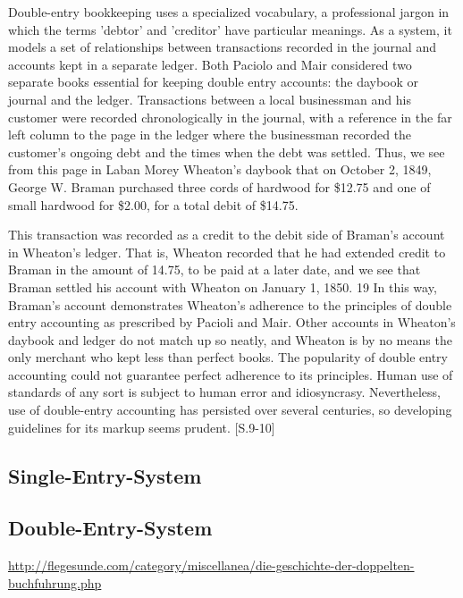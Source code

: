 \documentclass[12pt,a4paper]{article}
\begin{document}
Double-entry bookkeeping uses a specialized vocabulary, a professional jargon in which
the terms 'debtor' and 'creditor' have particular meanings. As a system, it models a set of
relationships between transactions recorded in the journal and accounts kept in a
separate ledger. Both Paciolo and Mair considered two separate books essential for
keeping double entry accounts: the daybook or journal and the ledger. Transactions
between a local businessman and his customer were recorded chronologically in the
journal, with a reference in the far left column to the page in the ledger where the
businessman recorded the customer's ongoing debt and the times when the debt was
settled. Thus, we see from this page in Laban Morey Wheaton's daybook that on October
2, 1849, George W. Braman purchased three cords of hardwood for \$12.75 and one of small
hardwood for \$2.00, for a total debit of \$14.75. 

This transaction was recorded as a credit to the debit side of Braman's account in
Wheaton's ledger. That is, Wheaton recorded that he had extended credit to Braman in
the amount of 14.75, to be paid at a later date, and we see that Braman settled his
account with Wheaton on January 1, 1850.
19 In this way, Braman's account demonstrates Wheaton's adherence to the principles of
double entry accounting as prescribed by Pacioli and Mair. Other accounts in Wheaton's
daybook and ledger do not match up so neatly, and Wheaton is by no means the only
merchant who kept less than perfect books. The popularity of double entry accounting
could not guarantee perfect adherence to its principles. Human use of standards of any
sort is subject to human error and idiosyncrasy. Nevertheless, use of double-entry
accounting has persisted over several centuries, so developing guidelines for its markup
seems prudent. [S.9-10]


\subsection{Single-Entry-System}

\subsection{Double-Entry-System}
\url{http://flegesunde.com/category/miscellanea/die-geschichte-der-doppelten-buchfuhrung.php}
\end{document}
